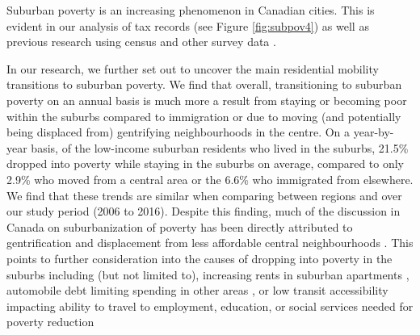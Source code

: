 Suburban poverty is an increasing phenomenon in Canadian cities. This is evident in our analysis of tax records (see Figure \ref{fig:subpov4}) as well as previous research using census and other survey data \cite{ades_are_2012,breau_pulling_2018,grant_changing_2020,allen_suburbanization_2021}.

In our research, we further set out to uncover the main residential mobility transitions to suburban poverty. We find that overall, transitioning to suburban poverty on an annual basis is much more a result from staying or becoming poor within the suburbs compared to immigration or due to moving (and potentially being displaced from) gentrifying neighbourhoods in the centre. On a year-by-year basis, of the low-income suburban residents who lived in the suburbs, 21.5\% dropped into poverty while staying in the suburbs on average, compared to only 2.9\% who moved from a central area or the 6.6\% who immigrated from elsewhere. We find that these trends are similar when comparing between regions and over our study period (2006 to 2016). Despite this finding, much of the discussion in Canada on suburbanization of poverty has been directly attributed to gentrification and displacement from less affordable central neighbourhoods \cite{grant_changing_2020}. This points to further consideration into the causes of dropping into poverty in the suburbs including (but not limited to), increasing rents in suburban apartments \cite{august_gentrification_2018}, automobile debt limiting spending in other areas \cite{walks_driving_2018}, or low transit accessibility impacting ability to travel to employment, education, or social services needed for poverty reduction \cite{allen_planning_2020} 


